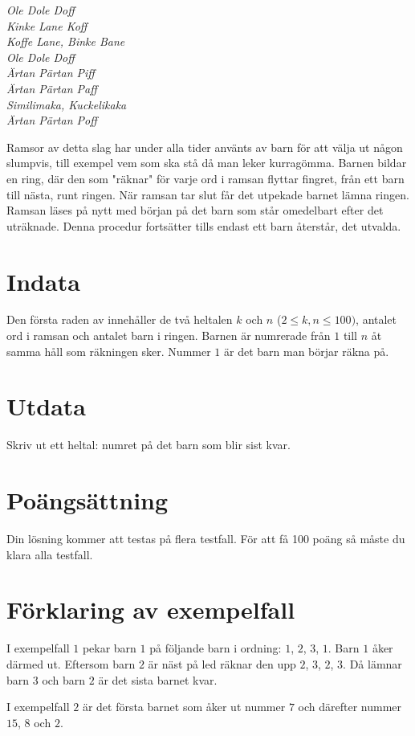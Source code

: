 

{\em
Ole Dole Doff\\ 
Kinke Lane Koff\\ 
Koffe Lane, Binke Bane\\ 
Ole Dole Doff \\
Ärtan Pärtan Piff\\
Ärtan Pärtan Paff \\
Similimaka, Kuckelikaka\\ 
Ärtan Pärtan Poff
}

Ramsor av detta slag har under alla tider använts av barn för att välja ut någon slumpvis, till
exempel vem som ska stå då man leker kurragömma. Barnen bildar en ring, där den som "räknar"
för varje ord i ramsan flyttar fingret, från ett barn till nästa, runt ringen. När ramsan
tar slut får det utpekade barnet lämna ringen. Ramsan läses på nytt med början på det barn som
står omedelbart efter det uträknade. Denna procedur fortsätter tills endast ett barn återstår, det utvalda.

\section*{Indata}
Den första raden av innehåller de två heltalen $k$ och $n$ ($2 \leq k,n \leq 100)$, antalet ord
i ramsan och antalet barn i ringen. Barnen är numrerade från $1$ till $n$ åt samma håll som räkningen
sker. Nummer $1$ är det barn man börjar räkna på.

\section*{Utdata}
Skriv ut ett heltal: numret på det barn som blir sist kvar.

\section*{Poängsättning}
Din lösning kommer att testas på flera testfall. För att få 100 poäng så måste du klara alla testfall.

\section*{Förklaring av exempelfall}
I exempelfall $1$ pekar barn $1$ på följande barn i ordning: $1$, $2$, $3$, $1$. Barn $1$ åker därmed ut.
Eftersom barn $2$ är näst på led räknar den upp $2$, $3$, $2$, $3$. Då lämnar barn $3$ och barn $2$ är
det sista barnet kvar.

I exempelfall $2$ är det första barnet som åker ut nummer $7$ och därefter nummer $15$, $8$ och $2$.
